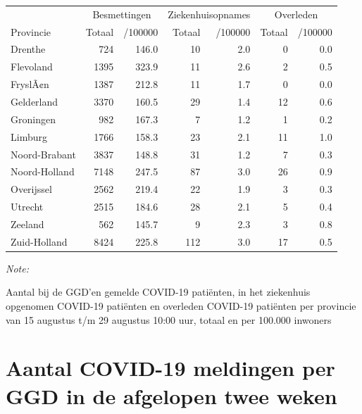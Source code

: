\documentclass[
  english,
  man,floatsintext]{apa6}
\begin{document}
\begin{table}
\centering
\begin{threeparttable}
\begin{tabular}{lrrrrrr}
\toprule
\multicolumn{1}{c}{ } & \multicolumn{2}{c}{Besmettingen} & \multicolumn{2}{c}{Ziekenhuisopnames} & \multicolumn{2}{c}{Overleden} \\
\cmidrule(l{3pt}r{3pt}){2-3} \cmidrule(l{3pt}r{3pt}){4-5} \cmidrule(l{3pt}r{3pt}){6-7}
Provincie & Totaal & /100000 & Totaal & /100000 & Totaal & /100000\\
\midrule
Drenthe & 724 & 146.0 & 10 & 2.0 & 0 & 0.0\\
Flevoland & 1395 & 323.9 & 11 & 2.6 & 2 & 0.5\\
FryslÃ¢n & 1387 & 212.8 & 11 & 1.7 & 0 & 0.0\\
Gelderland & 3370 & 160.5 & 29 & 1.4 & 12 & 0.6\\
Groningen & 982 & 167.3 & 7 & 1.2 & 1 & 0.2\\
Limburg & 1766 & 158.3 & 23 & 2.1 & 11 & 1.0\\
Noord-Brabant & 3837 & 148.8 & 31 & 1.2 & 7 & 0.3\\
Noord-Holland & 7148 & 247.5 & 87 & 3.0 & 26 & 0.9\\
Overijssel & 2562 & 219.4 & 22 & 1.9 & 3 & 0.3\\
Utrecht & 2515 & 184.6 & 28 & 2.1 & 5 & 0.4\\
Zeeland & 562 & 145.7 & 9 & 2.3 & 3 & 0.8\\
Zuid-Holland & 8424 & 225.8 & 112 & 3.0 & 17 & 0.5\\
\bottomrule
\end{tabular}
\begin{tablenotes}
\item \textit{Note: } 
\item Aantal bij de GGD’en gemelde COVID-19 patiënten, in het ziekenhuis opgenomen COVID-19 patiënten en overleden COVID-19 patiënten per provincie van 15 augustus t/m 29 augustus 10:00 uur, totaal en per 100.000 inwoners
\end{tablenotes}
\end{threeparttable}
\end{table}

\newpage

\hypertarget{aantal-covid-19-meldingen-per-ggd-in-de-afgelopen-twee-weken}{%
\section{Aantal COVID-19 meldingen per GGD in de afgelopen twee weken}\label{aantal-covid-19-meldingen-per-ggd-in-de-afgelopen-twee-weken}}
\end{document}
